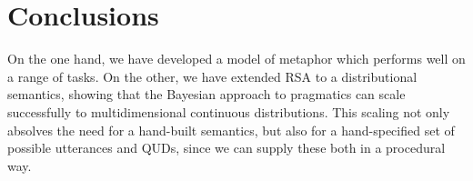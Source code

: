 \documentclass[10pt,letterpaper,twocolumn]{article}
\begin{document}








%
%
%



\section{Conclusions}

On the one hand, we have developed a model of metaphor which performs well on a range of tasks. On the other, we have extended RSA to a distributional semantics, showing that the Bayesian approach to pragmatics can scale successfully to multidimensional continuous distributions. This scaling not only absolves the need for a hand-built semantics, but also for a hand-specified set of possible utterances and QUDs, since we can supply these both in a procedural way.
\end{document}
